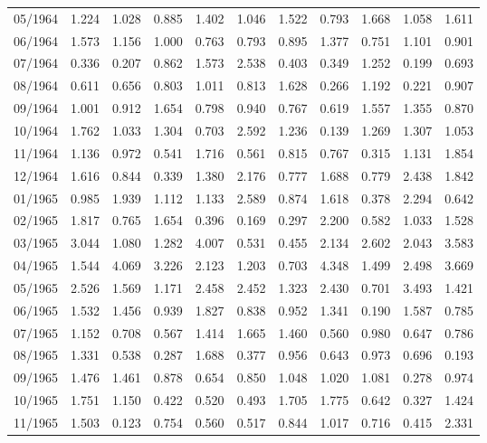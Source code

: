 \begin{tabular}{lrrrrrrrrrr}
05/1964 &  1.224 &  1.028 &  0.885 &  1.402 &  1.046 &  1.522 &  0.793 &  1.668 &  1.058 &  1.611 \\
06/1964 &  1.573 &  1.156 &  1.000 &  0.763 &  0.793 &  0.895 &  1.377 &  0.751 &  1.101 &  0.901 \\
07/1964 &  0.336 &  0.207 &  0.862 &  1.573 &  2.538 &  0.403 &  0.349 &  1.252 &  0.199 &  0.693 \\
08/1964 &  0.611 &  0.656 &  0.803 &  1.011 &  0.813 &  1.628 &  0.266 &  1.192 &  0.221 &  0.907 \\
09/1964 &  1.001 &  0.912 &  1.654 &  0.798 &  0.940 &  0.767 &  0.619 &  1.557 &  1.355 &  0.870 \\
10/1964 &  1.762 &  1.033 &  1.304 &  0.703 &  2.592 &  1.236 &  0.139 &  1.269 &  1.307 &  1.053 \\
11/1964 &  1.136 &  0.972 &  0.541 &  1.716 &  0.561 &  0.815 &  0.767 &  0.315 &  1.131 &  1.854 \\
12/1964 &  1.616 &  0.844 &  0.339 &  1.380 &  2.176 &  0.777 &  1.688 &  0.779 &  2.438 &  1.842 \\
01/1965 &  0.985 &  1.939 &  1.112 &  1.133 &  2.589 &  0.874 &  1.618 &  0.378 &  2.294 &  0.642 \\
02/1965 &  1.817 &  0.765 &  1.654 &  0.396 &  0.169 &  0.297 &  2.200 &  0.582 &  1.033 &  1.528 \\
03/1965 &  3.044 &  1.080 &  1.282 &  4.007 &  0.531 &  0.455 &  2.134 &  2.602 &  2.043 &  3.583 \\
04/1965 &  1.544 &  4.069 &  3.226 &  2.123 &  1.203 &  0.703 &  4.348 &  1.499 &  2.498 &  3.669 \\
05/1965 &  2.526 &  1.569 &  1.171 &  2.458 &  2.452 &  1.323 &  2.430 &  0.701 &  3.493 &  1.421 \\
06/1965 &  1.532 &  1.456 &  0.939 &  1.827 &  0.838 &  0.952 &  1.341 &  0.190 &  1.587 &  0.785 \\
07/1965 &  1.152 &  0.708 &  0.567 &  1.414 &  1.665 &  1.460 &  0.560 &  0.980 &  0.647 &  0.786 \\
08/1965 &  1.331 &  0.538 &  0.287 &  1.688 &  0.377 &  0.956 &  0.643 &  0.973 &  0.696 &  0.193 \\
09/1965 &  1.476 &  1.461 &  0.878 &  0.654 &  0.850 &  1.048 &  1.020 &  1.081 &  0.278 &  0.974 \\
10/1965 &  1.751 &  1.150 &  0.422 &  0.520 &  0.493 &  1.705 &  1.775 &  0.642 &  0.327 &  1.424 \\
11/1965 &  1.503 &  0.123 &  0.754 &  0.560 &  0.517 &  0.844 &  1.017 &  0.716 &  0.415 &  2.331 \\

\end{tabular}
